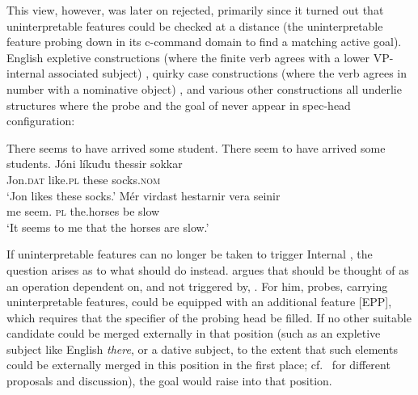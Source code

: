 \documentclass[output=paper]{langsci/langscibook}
\begin{document}
\ea\label{ex:26.1}
\z

This view, however, was later on rejected, primarily since it turned out that
uninterpretable features could be checked at a distance (the uninterpretable
feature probing down in its c-command domain to find a matching active goal).
English expletive constructions (where the finite verb agrees with a lower
VP-internal associated subject) ,  quirky case
constructions (where the verb agrees in number with a nominative object)
, and various other constructions all underlie structures
where the probe and the goal of  never appear in spec-head
configuration:

\ea\label{ex:26.2}
    \ea There seems to have arrived some student.
    \ex There seem to have arrived some students.
    \z
\ex\label{ex:26.3}  \parencite{Bobaljik2008} %
    \ea
    \gll    Jóni líkuđu thessir sokkar\\
            Jon.\textsc{dat} like.\textsc{pl} these socks.\textsc{nom}\\
    \glt    \enquote*{Jon likes these socks.}
    \ex
    \gll    Mér virdast hestarnir vera seinir\\
            me seem. \textsc{pl} the.horses be slow\\
    \glt    \enquote*{It seems to me that the horses are slow.}\\
    \z
\z

If uninterpretable features can no longer be taken to trigger Internal
, the question arises as to what should do instead.
\textcite{Chomsky2000,Chomsky2001} argues that  should be thought of as
an operation dependent on, and not triggered by, . For him, probes,
carrying uninterpretable features, could be equipped with an additional feature
[EPP], which requires that the specifier of the probing head be filled. If no
other suitable candidate could be merged externally in that position (such as
an expletive subject like English \emph{there}, or a dative subject, to the
extent that such elements could be externally merged in this position in the
first place; cf.\ \citealt{Chomsky2000,Deal2009} for different proposals and
discussion), the goal would raise into that position.
\end{document}
